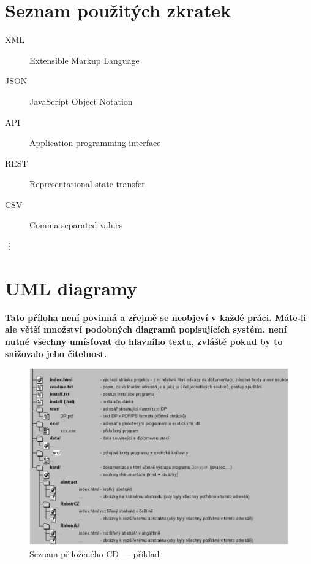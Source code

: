 \documentclass[11pt,twoside,a4paper]{book}
\begin{document}
\appendix




\chapter{Seznam použitých zkratek}

\begin{description}
\item[XML] Extensible Markup Language
\item[JSON] JavaScript Object Notation
\item[API] Application programming interface
\item[REST] Representational state transfer
\item[CSV] Comma-separated values
\end{description}
\vdots

\chapter{UML diagramy}
\textbf{\large Tato příloha není povinná a zřejmě se neobjeví v každé práci. Máte-li ale větší množství podobných diagramů popisujících systém, není nutné všechny umísťovat do hlavního textu, zvláště pokud by to snižovalo jeho čitelnost.}

\begin{figure}[h]
\begin{center}
\includegraphics[width=14cm]{figures/seznamcd}
\caption{Seznam přiloženého CD --- příklad}
\label{fig:seznamcd}
\end{center}
\end{figure}
\end{document}
